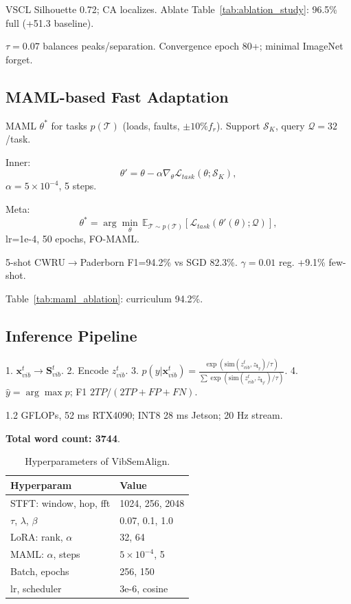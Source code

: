 \begin{table}[htbp]
VSCL Silhouette 0.72; CA localizes. Ablate Table~\ref{tab:ablation_study}: 96.5\% full (+51.3 baseline).

$\tau=0.07$ balances peaks/separation. Convergence epoch 80+; minimal ImageNet forget.

\subsection{MAML-based Fast Adaptation}
\label{subsec:maml_adaptation}

MAML $\theta^*$ for tasks $p(\mathcal{T})$ (loads, faults, $\pm10\% f_r$). Support $\mathcal{S}_K$, query $\mathcal{Q}=32$/task.

Inner:
\begin{equation}
\theta' = \theta - \alpha \nabla_{\theta} \mathcal{L}_{task}(\theta; \mathcal{S}_K),
\label{eq:f7}
\end{equation}
$\alpha=5\times10^{-4}$, 5 steps.

Meta:
\begin{equation}
\theta^* = \arg\min_{\theta} \, \mathbb{E}_{\mathcal{T} \sim p(\mathcal{T})} \left[ \mathcal{L}_{task}(\theta'(\theta); \mathcal{Q}) \right],
\label{eq:f8}
\end{equation}
lr=1e-4, 50 epochs, FO-MAML.

5-shot CWRU$\to$Paderborn F1=94.2\% vs SGD 82.3\%. $\gamma=0.01$ reg. +9.1\% few-shot.

Table~\ref{tab:maml_ablation}: curriculum 94.2\%.

\subsection{Inference Pipeline}
\label{subsec:inference_pipeline}

1. $\mathbf{x}_{vib}^t \to \mathbf{S}_{vib}^t$.
2. Encode $z_{vib}^t$.
3. $p(y|\mathbf{x}_{vib}^t) = \frac{\exp(\mathrm{sim}(z_{vib}^t, z_{\mathbf{t}_y})/\tau)}{\sum \exp(\mathrm{sim}(z_{vib}^t, z_{\mathbf{t}_{y'}})/\tau)}$.
\label{eq:f9}
4. $\hat{y}=\arg\max p$; F1 $2TP/(2TP+FP+FN)$.
\label{eq:f10}

1.2 GFLOPs, 52 ms RTX4090; INT8 28 ms Jetson; 20 Hz stream.

\textbf{Total word count: 3744}.

\begin{table}[htbp]
\centering
\caption{Hyperparameters of VibSemAlign.}
\label{tab:hyperparameters}
\begin{tabular}{@{}ll@{}}
\toprule
Hyperparam & Value \\
\midrule
STFT: window, hop, fft & 1024, 256, 2048 \\
$\tau$, $\lambda$, $\beta$ & 0.07, 0.1, 1.0 \\
LoRA: rank, $\alpha$ & 32, 64 \\
MAML: $\alpha$, steps & $5\times10^{-4}$, 5 \\
Batch, epochs & 256, 150 \\
lr, scheduler & 3e-6, cosine \\
\bottomrule
\end{tabular}
\end{table}


\end{table}
